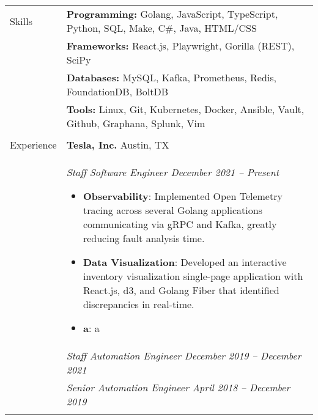 \documentclass[11pt]{article}
\begin{document}
\noindent
\begin{tabular}[t]{@{}p{1.05in} @{}p{6.00in}}

{Skills}
&
\textbf{Programming:} Golang, JavaScript, TypeScript, Python, SQL, Make, C\#, Java, HTML/CSS%
\\
&
\textbf{Frameworks:} React.js, Playwright, Gorilla (REST), SciPy%
\\
&
\textbf{Databases:} MySQL, Kafka, Prometheus, Redis, FoundationDB, BoltDB%
\\
&
\textbf{Tools:} Linux, Git, Kubernetes, Docker, Ansible, Vault, Github, Graphana, Splunk, Vim%
\\
\\

{Experience}
&
\textbf{Tesla, Inc.}  \hfill Austin, TX \\ &
 
    \textit{Staff Software Engineer \hfill December 2021 -- Present}
        \begin{itemize}[noitemsep,topsep=0pt]
            \item \textbf{Observability}: Implemented Open Telemetry tracing across several Golang applications communicating via gRPC and Kafka, greatly reducing fault analysis time.%
            \item \textbf{Data Visualization}: Developed an interactive inventory visualization single-page application with React.js, d3, and Golang Fiber that identified discrepancies in real-time.%
            \item \textbf{a}: a%
        \end{itemize}
\\ &
 
    \textit{Staff Automation Engineer \hfill December 2019 -- December 2021}
\\ &
 
    \textit{Senior Automation Engineer \hfill April 2018 -- December 2019}
\\ &
 

\end{tabular}
\end{document}
